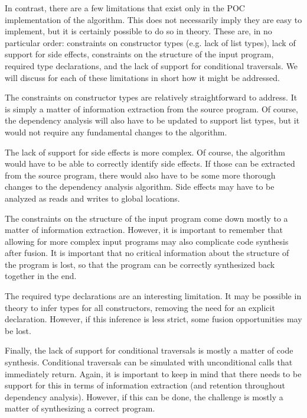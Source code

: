 In contrast, there are a few limitations that exist only in the POC implementation of the algorithm. This does not necessarily imply they are easy to implement, but it is certainly possible to do so in theory. These are, in no particular order: constraints on constructor types (e.g. lack of list types), lack of support for side effects, constraints on the structure of the input program, required type declarations, and the lack of support for conditional traversals. We will discuss for each of these limitations in short how it might be addressed.

The constraints on constructor types are relatively straightforward to address. It is simply a matter of information extraction from the source program. Of course, the dependency analysis will also have to be updated to support list types, but it would not require any fundamental changes to the algorithm.

The lack of support for side effects is more complex. Of course, the algorithm would have to be able to correctly identify side effects. If those can be extracted from the source program, there would also have to be some more thorough changes to the dependency analysis algorithm. Side effects may have to be analyzed as reads and writes to global locations.

The constraints on the structure of the input program come down mostly to a matter of information extraction. However, it is important to remember that allowing for more complex input programs may also complicate code synthesis after fusion. It is important that no critical information about the structure of the program is lost, so that the program can be correctly synthesized back together in the end.

The required type declarations are an interesting limitation. It may be possible in theory to infer types for all constructors, removing the need for an explicit declaration. However, if this inference is less strict, some fusion opportunities may be lost.

Finally, the lack of support for conditional traversals is mostly a matter of code synthesis. Conditional traversals can be simulated with unconditional calls that immediately return\cite{SakkaSN019}. Again, it is important to keep in mind that there needs to be support for this in terms of information extraction (and retention throughout dependency analysis). However, if this can be done, the challenge is mostly a matter of synthesizing a correct program.